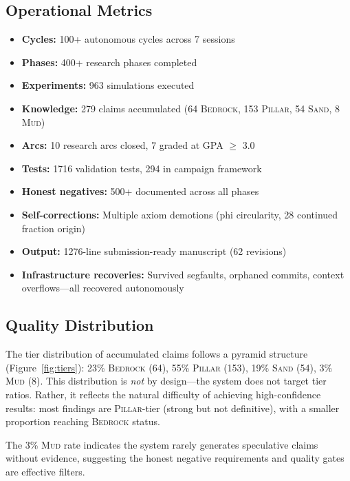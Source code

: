 \documentclass[11pt,a4paper]{article}
\newcommand{\bedrock}{\textsc{Bedrock}}
\newcommand{\pillar}{\textsc{Pillar}}
\newcommand{\sand}{\textsc{Sand}}
\newcommand{\mud}{\textsc{Mud}}
\begin{document}
\subsection{Operational Metrics}

\begin{itemize}[nosep]
    \item \textbf{Cycles:} 100+ autonomous cycles across 7 sessions
    \item \textbf{Phases:} 400+ research phases completed
    \item \textbf{Experiments:} 963 simulations executed
    \item \textbf{Knowledge:} 279 claims accumulated (64 \bedrock{}, 153 \pillar{},
          54 \sand{}, 8 \mud{})
    \item \textbf{Arcs:} 10 research arcs closed, 7 graded at GPA $\geq$ 3.0
    \item \textbf{Tests:} 1716 validation tests, 294 in campaign framework
    \item \textbf{Honest negatives:} 500+ documented across all phases
    \item \textbf{Self-corrections:} Multiple axiom demotions (phi circularity,
          28 continued fraction origin)
    \item \textbf{Output:} 1276-line submission-ready manuscript (62 revisions)
    \item \textbf{Infrastructure recoveries:} Survived segfaults, orphaned commits,
          context overflows---all recovered autonomously
\end{itemize}

\subsection{Quality Distribution}

The tier distribution of accumulated claims follows a pyramid structure
(Figure~\ref{fig:tiers}): 23\% \bedrock{} (64), 55\% \pillar{} (153),
19\% \sand{} (54), 3\% \mud{} (8). This distribution is \emph{not} by design---the
system does not target tier ratios. Rather, it reflects the natural difficulty of
achieving high-confidence results: most findings are \pillar{}-tier (strong but not
definitive), with a smaller proportion reaching \bedrock{} status.

The 3\% \mud{} rate indicates the system rarely generates speculative claims without
evidence, suggesting the honest negative requirements and quality gates are effective
filters.
\end{document}
